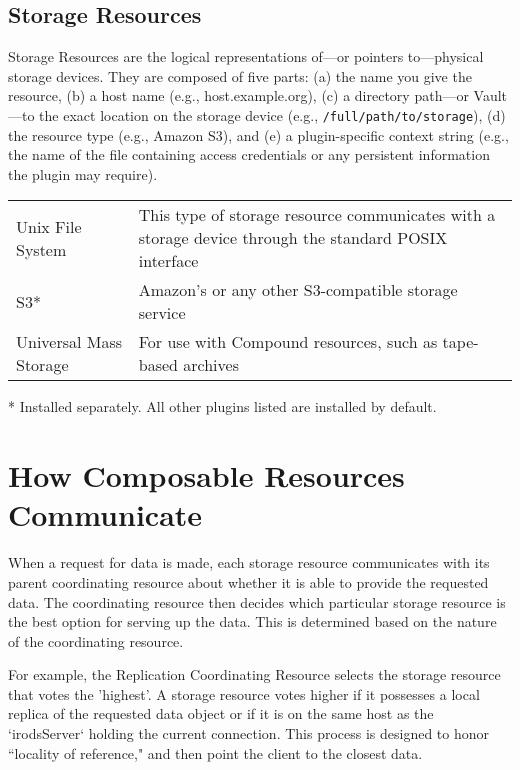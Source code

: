 \documentclass[10pt,oneside]{memoir}
\begin{document}
\subsection{Storage Resources}

Storage Resources are the logical representations of---or pointers to---physical storage devices. They are composed of five parts: (a) the name you give the resource, (b) a host name (e.g., host.example.org), (c) a directory path---or Vault---to the exact location on the storage device (e.g., \texttt{/full/path/to/storage}), (d) the resource type (e.g., Amazon S3), and (e) a plugin-specific context string (e.g., the name of the file containing access credentials or any persistent information the plugin may require).

\begin{center}
\def\arraystretch{1.5}%
\begin{tabular}{ |l|p{10cm}| }
\hline
Unix File System & This type of storage resource communicates with a storage device through the standard POSIX interface \\
S3* & Amazon's or any other S3-compatible storage service \\
Universal Mass Storage & For use with Compound resources, such as tape-based archives \\
\hline
\end{tabular}
\end{center}
\footnotesize\vspace{-5mm}\hspace{3mm}* Installed separately. All other plugins listed are installed by default.
\normalsize

\section{How Composable Resources Communicate}

When a request for data is made, each storage resource communicates with its parent coordinating resource about whether it is able to provide the requested data. The coordinating resource then decides which particular storage resource is the best option for serving up the data. This is determined based on the nature of the coordinating resource.

For example, the Replication Coordinating Resource selects the storage resource that votes the 'highest'.  A storage resource votes higher if it possesses a local replica of the requested data object or if it is on the same host as the `irodsServer` holding the current connection. This process is designed to honor ``locality of reference," and then point the client to the closest data.
\end{document}
